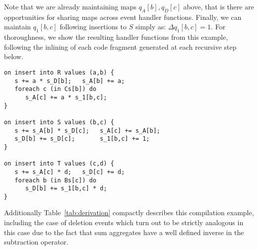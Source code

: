 \noindent Note that we are already maintaining maps $q_A[b], q_D[c]$ above, that
is there are opportunities for sharing maps across event handler functions.
Finally, we can maintain $q_1[b,c]$ following insertions to $S$ simply as:
$\Delta q_1[b,c] = 1$.
For thoroughness, we show the resulting handler functions from this example,
following the inlining of each code fragment generated at each recursive step
below.

\begin{verbatim}
on insert into R values (a,b) {
   s += a * s_D[b];   s_A[b] += a;
   foreach c (in Cs[b]) do
      s_A[c] += a * s_1[b,c];
}

on insert into S values (b,c) {
   s += s_A[b] * s_D[c];   s_A[c] += s_A[b];
   s_D[b] += s_D[c];       s_1[b,c] += 1;
}

on insert into T values (c,d) {
   s += s_A[c] * d;   s_D[c] += d;
   foreach b (in Bs[c]) do
      s_D[b] += s_1[b,c] * d;
}
\end{verbatim}

Additionally Table~\ref{tab:derivation} compactly describes this compilation
example, including the case of deletion events which turn out to be strictly analogous in
this case due to the fact that sum aggregates have a well defined inverse in the
subtraction operator.


